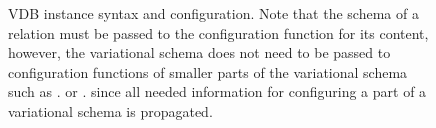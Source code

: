 \begin{figure}
\caption[Variational database syntax and configuration]{VDB instance syntax and configuration.
Note that the schema of a relation must be passed to the configuration function
for its content,
however, the variational schema does not need to be passed to configuration 
functions of smaller parts of the variational schema such as \orSem .  or \olSem .
since all needed information for configuring a part of a variational schema
is propagated. 
}
\label{fig:vdb-conf}
\end{figure} 

